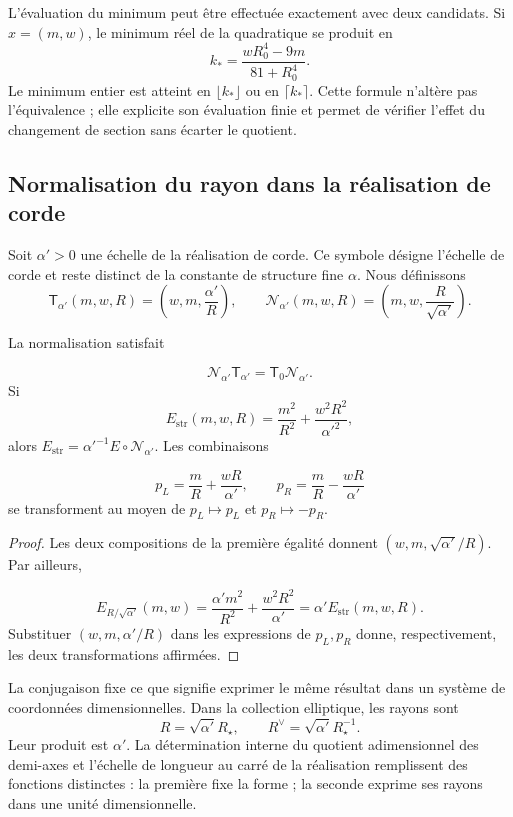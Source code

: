 L’évaluation du minimum peut être effectuée exactement avec deux
candidats. Si \(x=(m,w)\), le minimum réel de la quadratique
se produit en
\[
 k_* =\frac{wR_0^4-9m}{81+R_0^4}.
\]
Le minimum entier est atteint en \(\lfloor k_*\rfloor\) ou en
\(\lceil k_*\rceil\). Cette formule n’altère pas l’équivalence ;
elle explicite son évaluation finie et permet de vérifier l’effet
du changement de section sans écarter le quotient.


\subsection{Normalisation du rayon dans la réalisation de corde}

Soit \(\alpha'>0\) une échelle de la réalisation de corde.
Ce symbole désigne l’échelle de corde et reste distinct
de la constante de structure fine \(\alpha\). Nous définissons
\begin{equation}
 \mathsf T_{\alpha'}(m,w,R)
 =\left(w,m,\frac{\alpha'}R\right),\qquad
 \mathcal N_{\alpha'}(m,w,R)
 =\left(m,w,\frac R{\sqrt{\alpha'}}\right).
 \label{iv:eq:normalizacion-cuerda}
\end{equation}

\begin{theorem}
\label{iv:thm:normalizacion-cuerda}
La normalisation satisfait

\[
 \mathcal N_{\alpha'}\mathsf T_{\alpha'}
 =\mathsf T_0\mathcal N_{\alpha'}.
\]
Si
\[
 E_{\mathrm{str}}(m,w,R)
 =\frac{m^2}{R^2}+\frac{w^2R^2}{\alpha'^2},
\]
alors
\(E_{\mathrm{str}}=\alpha'^{-1}E\circ\mathcal N_{\alpha'}\).
Les combinaisons

\[
 p_L=\frac mR+\frac{wR}{\alpha'},\qquad
 p_R=\frac mR-\frac{wR}{\alpha'}
\]
se transforment au moyen de \(p_L\mapsto p_L\) et \(p_R\mapsto-p_R\).
\end{theorem}
\begin{proof}
Les deux compositions de la première égalité donnent
\((w,m,\sqrt{\alpha'}/R)\). Par ailleurs,

\[
 E_{R/\sqrt{\alpha'}}(m,w)
 =\frac{\alpha'm^2}{R^2}+\frac{w^2R^2}{\alpha'}
 =\alpha'E_{\mathrm{str}}(m,w,R).
\]
Substituer \((w,m,\alpha'/R)\) dans les expressions de
\(p_L,p_R\) donne, respectivement, les deux transformations
affirmées.
\end{proof}

La conjugaison fixe ce que signifie exprimer le même résultat dans
un système de coordonnées dimensionnelles. Dans la collection elliptique, les rayons sont
\[
 R=\sqrt{\alpha'}R_\star,\qquad
 R^\vee=\sqrt{\alpha'}R_\star^{-1}.
\]
Leur produit est \(\alpha'\). La détermination interne du quotient
adimensionnel des demi-axes et l’échelle de longueur au carré de la
réalisation remplissent des fonctions distinctes : la première fixe la forme ;
la seconde exprime ses rayons dans une unité dimensionnelle.

